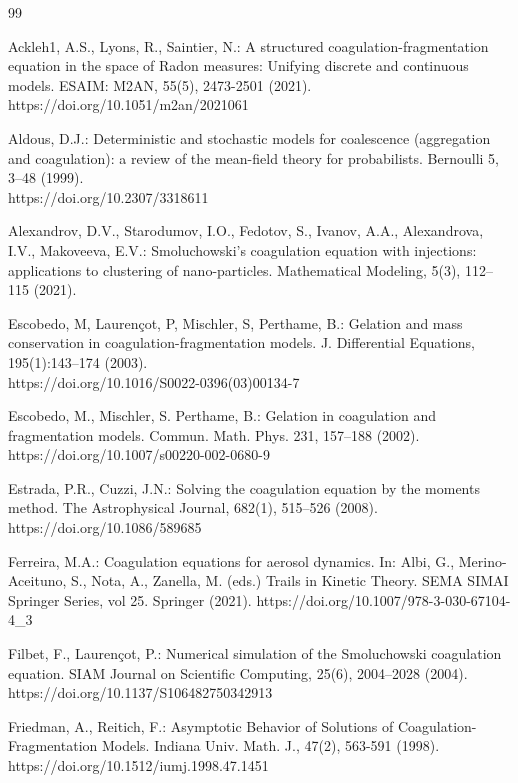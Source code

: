 \documentclass[a4paper,11pt]{article}
\begin{document}
\begin{thebibliography}{99}

Ackleh1, A.S., Lyons, R., Saintier, N.:
A structured coagulation-fragmentation equation in the space of Radon measures: Unifying discrete and continuous models.
ESAIM: M2AN, 55(5), 2473-2501 (2021). https://doi.org/10.1051/m2an/2021061

Aldous, D.J.: 
Deterministic and stochastic models for coalescence (aggregation and coagulation): a review of the mean-field theory for probabilists. Bernoulli 5, 3–48 (1999).\\ https://doi.org/10.2307/3318611

Alexandrov, D.V., Starodumov, I.O., Fedotov, S.,
Ivanov, A.A., Alexandrova, I.V., Makoveeva, E.V.: 
Smoluchowski’s coagulation equation with injections: applications to clustering of nano-particles. Mathematical Modeling, 5(3), 112–115 (2021).

Escobedo, M, Lauren\c{c}ot, P, Mischler, S, Perthame, B.: Gelation and mass conservation
in coagulation-fragmentation models. J. Differential Equations, 195(1):143–174
(2003).\\
https://doi.org/10.1016/S0022-0396(03)00134-7

Escobedo, M., Mischler, S. Perthame, B.: Gelation in coagulation and fragmentation models. Commun. Math. Phys. 231, 157–188 (2002). https://doi.org/10.1007/s00220-002-0680-9

Estrada, P.R., Cuzzi, J.N.: Solving the coagulation equation by the moments method.
The Astrophysical Journal, 682(1), 515–526 (2008). https://doi.org/10.1086/589685

Ferreira, M.A.: Coagulation equations for aerosol dynamics. In: Albi, G., Merino-Aceituno, S., Nota, A., Zanella, M. (eds.) Trails in Kinetic Theory. SEMA SIMAI Springer Series, vol 25. Springer (2021). https://doi.org/10.1007/978-3-030-67104-4\_3

Filbet, F., Lauren\c{c}ot, P.: Numerical simulation of the Smoluchowski coagulation equation. SIAM Journal on Scientific Computing, 25(6), 2004–2028 (2004).\\
https://doi.org/10.1137/S106482750342913

Friedman, A., Reitich, F.:
Asymptotic Behavior of Solutions of Coagulation-Fragmentation Models.
Indiana Univ. Math. J., 47(2), 563-591 (1998).\\
https://doi.org/10.1512/iumj.1998.47.1451


\end{thebibliography}
\end{document}
